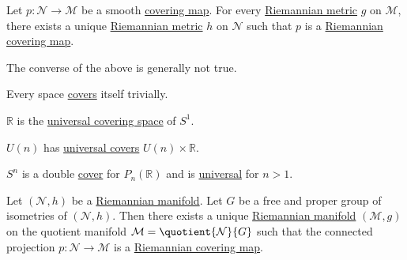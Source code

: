 \begin{proposition}
	Let \(p\colon \mathcal{N} \to \mathcal{M} \) be a smooth \hyperref[def:covering-map]{covering map}. For every \hyperref[def:Riemannian-metric]{Riemannian metric} \(g\) on \(\mathcal{M} \), there exists a unique \hyperref[def:Riemannian-metric]{Riemannian metric} \(h\) on \(\mathcal{N} \) such that \(p\) is a \hyperref[def:Riemannian-covering-map]{Riemannian covering map}.
\end{proposition}

\begin{note}
	The converse of the above is generally not true.
\end{note}

\begin{eg}
	Every space \hyperref[def:covering-map]{covers} itself trivially.
\end{eg}

\begin{eg}
	\(\mathbb{R} \) is the \hyperref[not:universal-covering-space]{universal covering space} of \(S^1\).
\end{eg}

\begin{eg}
	\(U(n)\) has \hyperref[not:universal-covering-space]{universal covers} \(U(n) \times \mathbb{R} \).
\end{eg}

\begin{eg}
	\(S^n\) is a double \hyperref[not:covering-space]{cover} for \(P_n(\mathbb{R} )\) and is \hyperref[not:universal-covering-space]{universal} for \(n > 1\).
\end{eg}

\begin{proposition}
	Let \((\mathcal{N}, h )\) be a \hyperref[def:Riemannian-manifold]{Riemannian manifold}. Let \(G\) be a free and proper group of isometries of \((\mathcal{N} , h)\). Then there exists a unique \hyperref[def:Riemannian-manifold]{Riemannian manifold} \((\mathcal{M} ,g)\) on the quotient manifold \(\mathcal{M} = \quotient{\mathcal{N} }{G} \) such that the connected projection \(p\colon \mathcal{N}  \to  \mathcal{M} \) is a \hyperref[def:Riemannian-covering-map]{Riemannian covering map}.
\end{proposition}